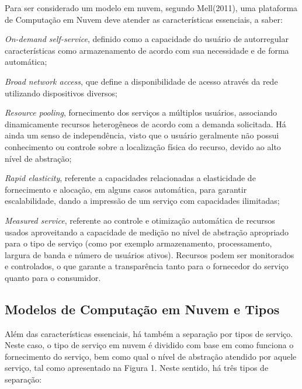 Para ser considerado um modelo em nuvem, segundo Mell(2011), uma plataforma de Computação em Nuvem deve atender as características essenciais, a saber: 
\begin{alineas}
	\item \textit{On-demand self-service}, definido como a capacidade do usuário de autorregular características como armazenamento de acordo com sua necessidade e de forma automática;
	\item \textit{Broad network access}, que define a disponibilidade de acesso através da rede utilizando dispositivos diversos; 
	\item \textit{Resource pooling}, fornecimento dos serviços a múltiplos usuários, associando dinamicamente recursos heterogêneos de acordo com a demanda solicitada. Há ainda um senso de independência, visto que o usuário geralmente não possui conhecimento ou controle sobre a localização física do recurso, devido ao alto nível de abstração; 
	\item \textit{Rapid elasticity}, referente a capacidades relacionadas a elasticidade de fornecimento e alocação, em alguns casos automática, para garantir escalabilidade, dando a impressão de um serviço com capacidades ilimitadas; 
	\item \textit{Measured service}, referente ao controle e otimização automática de recursos usados aproveitando a capacidade de medição no nível de abstração apropriado para o tipo de serviço (como por exemplo armazenamento, processamento, largura de banda e número de usuários ativos). Recursos podem ser monitorados e controlados, o que garante a transparência tanto para o fornecedor do serviço quanto para o consumidor. 		
\end{alineas}

\subsection{Modelos de Computação em Nuvem e Tipos}\label{sec:mod}

Além das características essenciais, há também a separação por tipos de serviço. Neste caso, o tipo de serviço em nuvem é dividido com base em como funciona o fornecimento do serviço, bem como qual o nível de abstração atendido por aquele serviço, tal como apresentado na Figura 1. Neste sentido, há três tipos de separação: 

